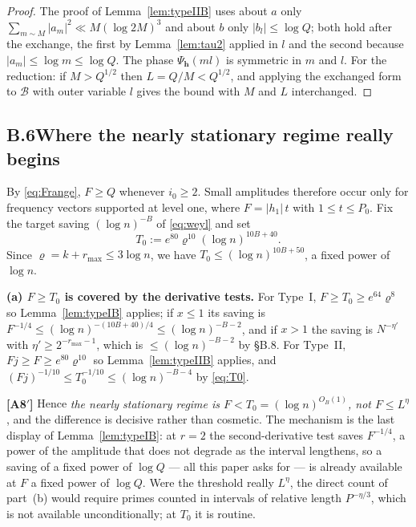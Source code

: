 \documentclass[11pt]{article}
\theoremstyle{definition}
\theoremstyle{plain}
\begin{document}
\begin{proof}
The proof of Lemma~\ref{lem:typeIIB} uses about $a$ only
$\sum_{m\sim M}|a_{m}|^{2}\ll M(\log 2M)^{3}$ and about $b$ only
$|b_{l}|\le\log Q$; both hold after the exchange, the first by
Lemma~\ref{lem:tau2} applied in $l$ and the second because
$|a_{m}|\le\log m\le\log Q$.  The phase $\Psi_{\mathbf h}(ml)$ is
symmetric in $m$ and $l$.  For the reduction: if $M>Q^{1/2}$ then
$L=Q/M<Q^{1/2}$, and applying the exchanged form to $\mathcal B$ with
outer variable $l$ gives the bound with $M$ and $L$ interchanged.
\end{proof}

\subsection*{B.6\quad Where the nearly stationary regime really begins}

By \eqref{eq:Frange}, $F\ge Q$ whenever $i_{0}\ge2$.  Small amplitudes
therefore occur only for frequency vectors supported at level one, where
$F=|h_{1}|\,t$ with $1\le t\le P_{0}$.  Fix the target saving
$(\log n)^{-B}$ of \eqref{eq:weyl} and set
\begin{equation}\label{eq:T0}
T_{0}:=e^{80}\varrho^{10}(\log n)^{10B+40}.
\end{equation}
Since $\varrho=k+r_{\max}\le3\log n$, we have
$T_{0}\le(\log n)^{10B+50}$, a fixed power of $\log n$.

\smallskip
\noindent\textbf{(a) $F\ge T_{0}$ is covered by the derivative tests.}
For Type~I, $F\ge T_{0}\ge e^{64}\varrho^{8}$ so Lemma~\ref{lem:typeIB}
applies; if $x\le1$ its saving is $F^{-1/4}\le(\log n)^{-(10B+40)/4}
\le(\log n)^{-B-2}$, and if $x>1$ the saving is $N^{-\eta'}$ with
$\eta'\ge2^{-r_{\max}-1}$, which is $\le(\log n)^{-B-2}$ by \S B.8.  For
Type~II, $Fj\ge F\ge e^{80}\varrho^{10}$ so Lemma~\ref{lem:typeIIB}
applies, and $(Fj)^{-1/10}\le T_{0}^{-1/10}\le(\log n)^{-B-4}$ by
\eqref{eq:T0}.

\textbf{[A8$'$]}  Hence \emph{the nearly stationary regime is
$F<T_{0}=(\log n)^{O_{B}(1)}$, not $F\le L^{\eta}$}, and the difference
is decisive rather than cosmetic.  The mechanism is the last display of
Lemma~\ref{lem:typeIB}: at $r=2$ the second-derivative test saves
$F^{-1/4}$, a power of the amplitude that does not degrade as the
interval lengthens, so a saving of a fixed power of $\log Q$ --- all this
paper asks for --- is already available at $F$ a fixed power of $\log Q$.
Were the threshold really $L^{\eta}$, the direct count of part~(b) would
require primes counted in intervals of relative length $P^{-\eta/3}$,
which is not available unconditionally; at $T_{0}$ it is routine.
\end{document}
